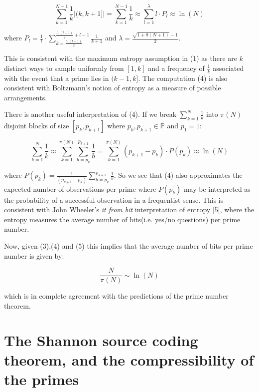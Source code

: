 \documentclass{article}
\begin{document}
\begin{equation}
\sum_{k=1}^{N-1} \frac{1}{k} \lvert (k,k+1] \rvert = \sum_{k=1}^{N-1} \frac{1}{k} \approx \sum_{l=1}^\lambda l \cdot P_l \approx \ln(N) \tag{4}
\end{equation}

where $P_l = \frac{1}{l} \cdot \sum_{k= \frac{l \cdot (l-1)}{2}}^{\frac{l\cdot (l-1)}{2}+l-1} \frac{1}{k+1}$ and  $\lambda = \frac{\sqrt{1+8(N+1)}-1}{2}$.

This is consistent with the maximum entropy assumption in (1) as there are $k$ distinct ways to sample uniformly from $[1,k]$ and a frequency of $\frac{1}{k}$ associated with the event that a prime lies in $(k-1,k]$. The computation (4) is also consistent with Boltzmann's notion of entropy as a measure of possible arrangements.

There is another useful interpretation of (4). If we break $\sum_{k=1}^{N} \frac{1}{k}$ into $\pi(N)$ disjoint blocks of size $[p_k,p_{k+1}]$ where $p_k,p_{k+1} \in \mathbb{P}$ and $p_1 = 1$:

\begin{equation}
\sum_{k=1}^{N} \frac{1}{k} \approx \sum_{k=1}^{\pi(N)} \sum_{b=p_k}^{p_{k+1}} \frac{1}{b} = \sum_{k=1}^{\pi(N)} (p_{k+1}-p_k)\cdot P(p_k) \approx \ln(N) \tag{5}
\end{equation}

where $P(p_k)= \frac{1}{(p_{k+1}-p_k)} \sum_{b=p_k}^{p_{k+1}} \frac{1}{b}$. So we see that (4) also approximates the expected number of observations per prime where $P(p_k)$ may be interpreted as the probability of a successful observation in a frequentist sense. This is consistent with John Wheeler's \textit{it from bit} interpretation of entropy [5], where the entropy measures the average number of bits(i.e. yes/no questions) per prime number.

Now, given (3),(4) and (5) this implies that the average number of bits per prime number is given by:

\begin{equation}
\frac{N}{\pi(N)} \sim \ln(N)
\end{equation}

which is in complete agreement with the predictions of the prime number theorem.

\section{The Shannon source coding theorem, and the compressibility of the primes}
\end{document}
